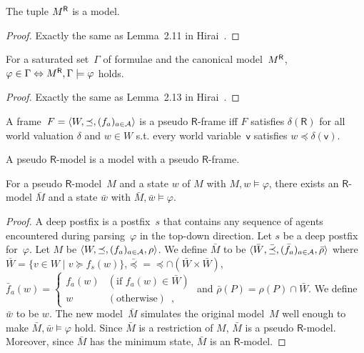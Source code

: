   \begin{lemma}
   The tuple ${M}^{\mathsf R}$ is a model.
  \end{lemma}
  \begin{proof}
   Exactly the same as Lemma~2.11 in Hirai~\cite{hirailpar}.
  \end{proof}

  \begin{proposition}
   \label{X}
   For a saturated set~$\Gamma$ of formulae and the canonical model~${M}^{\mathsf R}$,
   $\varphi\in\Gamma\Leftrightarrow {M}^{\mathsf R},\Gamma\models\varphi$ holds.
  \end{proposition}
  \begin{proof}
   Exactly the same as Lemma~2.13 in Hirai~\cite{hirailpar}.
  \end{proof}

  \begin{definition}
   A frame~$F = \langle{W,\preceq, (f_a)_{a\in\mathcal A}}\rangle$
   is a pseudo $\mathsf R$-frame iff $F$ satisfies
   $\delta(\mathsf R)$ for all world valuation
   $\delta$ and $w\in W$ s.t.
   every world variable~$\mathsf v$ satisfies
   $w\preceq \delta(\mathsf v)$.
  \end{definition}
  A pseudo $\mathsf R$-model is a model with a pseudo $\mathsf R$-frame.

  \begin{lemma}
   \label{pseudo-real}
   For a pseudo $\mathsf R$-model~$M$ and a state $w$ of $M$ with
   $M,w\models\varphi$,
   there exists an $\mathsf R$-model $\bar M$ and a state $\bar w$
   with $\bar M,\bar w\models\varphi$.
  \end{lemma}
  \begin{proof}
   A deep postfix is a postfix~$s$ that contains any sequence of agents
   encountered during parsing~$\varphi$ in the top-down direction.
   Let $s$ be a deep postfix for~$\varphi$. Let $M$ be
   $\langle{W,\preceq,(f_a)_{a\in\mathcal A},\rho}\rangle$.
   We define $\bar M$ to be $\langle{\bar W,\bar\preceq,
   (\bar f_a)_{a\in\mathcal A},\bar \rho}\rangle$ where
   $\bar W=\{v\in W\mid v\succeq f_s(w)\}$,$\bar\preceq =
   \preceq\cap (\bar W\times\bar W)$,
   $\bar f_a(w)= \begin{cases}
		  f_a(w)&(\mbox{if }f_a(w)\in\bar W)\\
		  w&(\mbox{otherwise})\enspace,
		 \end{cases}$
   and $\bar \rho(P) =\rho(P)\cap\bar W$.
   We define $\bar w$ to be $w$.
   The new model~$\bar M$ simulates the original model~$M$ well enough
   to make $\bar M,\bar w\models\varphi$ hold.
   Since $\bar M$ is a restriction of $M$, $\bar M$ is a pseudo
   $\mathsf R$-model.
   Moreover, since $\bar M$ has the minimum state, $\bar M$ is an
   $\mathsf R$-model.
  \end{proof}

